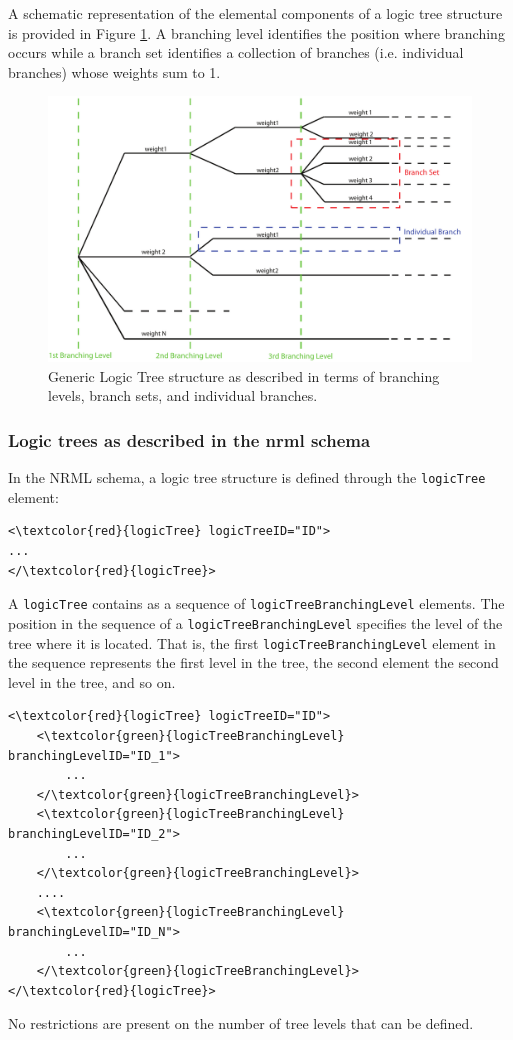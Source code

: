 A schematic representation of the elemental components of a logic tree 
structure is provided in Figure \ref{glts}. 
A branching level identifies the position where branching occurs while 
a branch set identifies a collection of branches (i.e. individual branches) whose weights sum to 1.
%
\begin{figure}[!h]
\centering
\includegraphics[width=15cm]{./figures/hazard/GenericLogicTreeStructure.pdf}
\caption{Generic Logic Tree structure as described in terms of branching 
levels, branch sets, and individual branches.}
\label{glts}
\end{figure}

\subsubsection{Logic trees as described in the nrml schema}
In the NRML schema, a logic tree structure is defined through the 
\Verb+logicTree+ element: 
%
\begin{Verbatim}[frame=single, commandchars=\\\{\}]
<\textcolor{red}{logicTree} logicTreeID="ID">
...
</\textcolor{red}{logicTree}>
\end{Verbatim}
%
A \Verb+logicTree+ contains as a sequence of \Verb+logicTreeBranchingLevel+ 
elements. 
The position in the sequence of a \Verb+logicTreeBranchingLevel+ specifies 
the level of the tree where it is located. That is, the first 
\texttt{logicTreeBranchingLevel} element in the sequence represents 
the first level in the tree, the second element the second level in
the tree, and so on.
%
\begin{Verbatim}[frame=single, commandchars=\\\{\}]
<\textcolor{red}{logicTree} logicTreeID="ID">
	<\textcolor{green}{logicTreeBranchingLevel} branchingLevelID="ID_1">
		...
	</\textcolor{green}{logicTreeBranchingLevel}>
	<\textcolor{green}{logicTreeBranchingLevel} branchingLevelID="ID_2">
		...
	</\textcolor{green}{logicTreeBranchingLevel}>
	....
	<\textcolor{green}{logicTreeBranchingLevel} branchingLevelID="ID_N">
		...
	</\textcolor{green}{logicTreeBranchingLevel}>
</\textcolor{red}{logicTree}>
\end{Verbatim}
No restrictions are present on the number of tree levels that can 
be defined.

